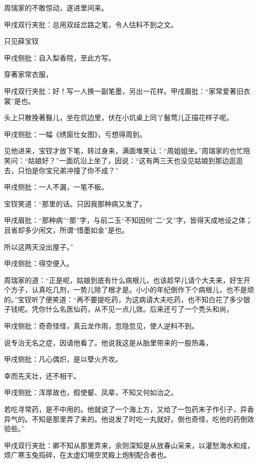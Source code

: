 \begin{parag}


    周瑞家的不敢惊动，遂进里间来。\begin{note}甲戌双行夹批：总用双歧岔路之笔，令人估料不到之文。\end{note}只见薛宝钗\begin{note}甲戌侧批：自入梨香院，至此方写。\end{note}穿著家常衣服，\begin{note}甲戌双行夹批：好！写一人换一副笔墨，另出一花样。甲戌眉批：“家常爱著旧衣裳”是也。\end{note}头上只散挽著䰖儿，坐在炕边里，伏在小炕桌上同丫鬟莺儿正描花样子呢。\begin{note}甲戌侧批：一幅《绣窗仕女图》，亏想得周到。\end{note}见他进来，宝钗才放下笔，转过身来，满面堆笑让：“周姐姐坐。”周瑞家的也忙陪笑问：“姑娘好？”一面炕沿上坐了，因说：“这有两三天也没见姑娘到那边逛逛去，只怕是你宝兄弟冲撞了你不成？”\begin{note}甲戌侧批：一人不漏，一笔不板。\end{note}宝钗笑道：“那里的话。只因我那种病又发了，\begin{note}甲戌眉批：“那种病”“那”字，与前二玉“不知因何”二“又”字，皆得天成地设之体；且省却多少闲文，所谓“惜墨如金”是也。\end{note}所以这两天没出屋子。”\begin{note}甲戌侧批：得空便入。\end{note}周瑞家的道：“正是呢，姑娘到底有什么病根儿，也该趁早儿请个大夫来，好生开个方子，认真吃几剂，一势儿除了根才是。小小的年纪倒作下个病根儿，也不是顽的。”宝钗听了便笑道：“再不要提吃药，为这病请大夫吃药，也不知白花了多少银子钱呢。凭你什么名医仙药，从不见一点儿效。后来还亏了一个秃头和尚，\begin{note}甲戌侧批：奇奇怪怪，真云龙作雨，忽隐忽见，使人逆料不到。\end{note}说专治无名之症，因请他看了。他说我这是从胎里带来的一股热毒，\begin{note}甲戌侧批：凡心偶炽，是以孽火齐攻。\end{note}幸而先天壮，还不相干。\begin{note}甲戌侧批：浑厚故也，假使颦、凤辈，不知又何如治之。\end{note}若吃寻常药，是不中用的。他就说了一个海上方，又给了一包药末子作引子，异香异气的。不知是那里弄了来的。他说发了时吃一丸就好。倒也奇怪，吃他的药倒效验些。”\begin{note}甲戌双行夹批：卿不知从那里弄来，余则深知是从放春山采来，以灌愁海水和成，烦广寒玉兔捣碎，在太虚幻境空灵殿上炮制配合者也。\end{note}
\end{parag}


